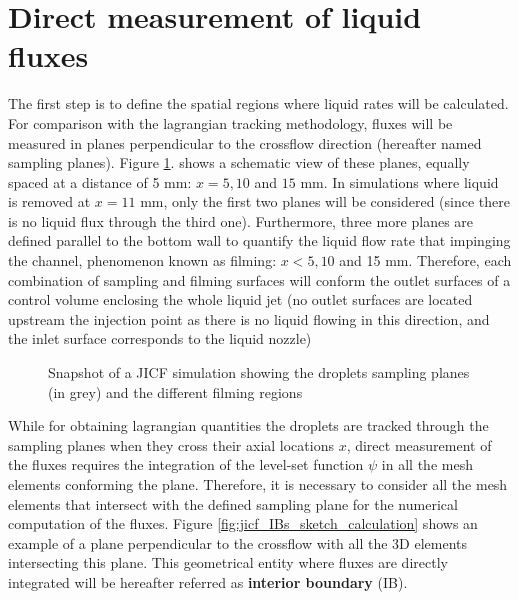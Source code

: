 \section{Direct measurement of liquid fluxes}
\label{app:processing_JICF_IBS}

The first step is to define the spatial regions where liquid rates will be calculated. For comparison with the lagrangian tracking methodology, fluxes will be measured in planes perpendicular to the crossflow direction (hereafter named sampling planes). Figure \ref{fig:jicf_interior_boundaries_surface_measurements}.  shows a schematic view of these planes, equally spaced at a distance of 5 mm: $x = 5, 10$ and $15$ mm. In simulations where liquid is removed at $x = 11$ mm, only the first two planes will be considered (since there is  no liquid flux through the third one). Furthermore, three more planes are defined parallel to the bottom wall to quantify the liquid flow rate that impinging the channel, phenomenon known as filming: $x < 5, 10$ and 15 mm. Therefore, each combination of sampling and filming surfaces will conform the outlet surfaces of a control volume enclosing the whole liquid jet (no outlet surfaces are located upstream the injection point as there is no liquid flowing in this direction, and the inlet surface corresponds to the liquid
nozzle)



\begin{figure}[ht]
     \centering
     \caption{Snapshot of a JICF simulation showing the droplets sampling planes (in grey) and the different filming regions}
      \label{fig:jicf_interior_boundaries_surface_measurements}
\end{figure}

While for obtaining lagrangian quantities the droplets are tracked through the sampling planes when they cross their axial locations $x$, direct measurement of the fluxes requires the integration of the level-set function $\psi$ in all the mesh elements conforming the plane. Therefore, it is necessary to consider all the mesh elements that intersect with the defined sampling plane for the numerical computation of the fluxes. Figure \ref{fig:jicf_IBs_sketch_calculation} shows an example of a plane perpendicular to the crossflow with all the 3D elements intersecting this plane. This geometrical entity where fluxes are directly integrated will be hereafter referred as \textbf{interior boundary} (IB). 

